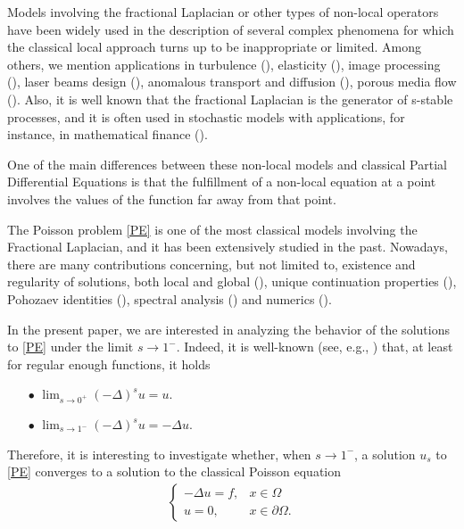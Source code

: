 \documentclass[reqno,twoside]{amsart}
\numberwithin{equation}{section}
\newcommand{\fl}[2]{(-\Delta)^#1#2}
\begin{document}
Models involving the fractional Laplacian or other types of non-local operators have been widely used in the description of several complex phenomena for which the classical local approach turns up to be inappropriate or limited. Among others, we mention applications in turbulence (\cite{bakunin2008turbulence}), elasticity (\cite{dipierro2015dislocation}), image processing (\cite{gilboa2008nonlocal}), laser beams design (\cite{longhi2015fractional}), anomalous transport and diffusion (\cite{meerschaert2012fractional}), porous media flow (\cite{vazquez2012nonlinear}). Also, it is well known that the fractional Laplacian is the generator of s-stable processes, and it is often used in stochastic models with applications, for instance, in mathematical finance (\cite{levendorskii2004pricing}).  

One of the main differences between these non-local models and  classical Partial Differential Equations is  that the fulfillment of a non-local equation  at a point involves the values of the function far away from that point. 

The Poisson problem \eqref{PE} is one of the most classical models involving the Fractional Laplacian, and it has been extensively studied in the past. Nowadays, there are many contributions concerning, but not limited to, existence and regularity of solutions, both local and global (\cite{biccari2017local,cozzi2017interior,grubb2015fractional,
leonori2015basic,ros2016boundary,ros2014dirichlet,servadei2014weak}), unique continuation properties (\cite{fall2014unique}), Pohozaev identities (\cite{ros2014pohozaev}), spectral analysis (\cite{frank2016refined}) and numerics (\cite{acosta2017fractional}).  

In the present paper, we are interested in analyzing the behavior of the solutions to \eqref{PE} under the limit $s\to 1^-$. Indeed, it is well-known (see, e.g., \cite{dihitchhiker,stinga2010extension}) that, at least for regular enough functions, it holds 
\begin{itemize}
	\item[$\bullet$] $\lim_{s\to 0^+}\fl{s}{u} = u$.
	
	\item[$\bullet$] $\lim_{s\to 1^-}\fl{s}{u} = -\Delta u$.
\end{itemize}

Therefore, it is interesting to investigate whether, when $s\to 1^-$, a solution $u_s$ to \eqref{PE} converges to a solution to the classical Poisson equation 
\begin{align}\label{poisson}
	\begin{cases}
	-\Delta u = f, &x\in\Omega\tag{$\mathcal P$}
	\\
	u = 0, & x\in\partial\Omega.
	\end{cases}
\end{align}
\end{document}
